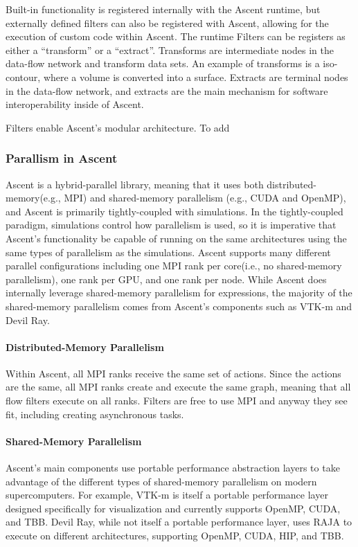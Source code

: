 
Built-in functionality is registered internally with the Ascent runtime,
but externally defined filters can also be registered with Ascent,
allowing for the execution of custom code within Ascent.
%
The runtime Filters can be registers as either a ``transform'' or a ``extract''.
%
Transforms are intermediate nodes in the data-flow network and transform
data sets.
%
An example of transforms is a iso-contour, where a volume is converted
into a surface.
%
Extracts are terminal nodes in the data-flow network, and extracts
are the main mechanism for software interoperability inside of Ascent.

Filters enable Ascent's modular architecture.
%
To add

\subsubsection{Parallism in Ascent}
Ascent is a hybrid-parallel library, meaning that it uses both
distributed-memory(e.g., MPI) and shared-memory parallelism
(e.g., CUDA and OpenMP), and Ascent is primarily  
tightly-coupled with simulations.
%
In the tightly-coupled paradigm, simulations control how parallelism is used, so
it is imperative that Ascent's functionality be capable of running
on the same architectures using the same types of parallelism as the
simulations.
%
Ascent supports many different parallel configurations including
one MPI rank per core(i.e., no shared-memory parallelism), one rank
per GPU, and one rank per node.
%
While Ascent does internally leverage shared-memory parallelism
for expressions, the majority of the shared-memory parallelism comes
from Ascent's components such as VTK-m and Devil Ray.

\paragraph{Distributed-Memory Parallelism}
Within Ascent, all MPI ranks receive the same set of actions.
%
Since the actions are the same, all MPI ranks create and execute the same graph,
meaning
that all flow filters execute on all ranks.
%
Filters are free to use MPI and anyway they see fit, including
creating asynchronous tasks.

\paragraph{Shared-Memory Parallelism}
Ascent's main components use portable performance abstraction layers to
take advantage of the different types of shared-memory parallelism on
modern supercomputers.
%
For example, VTK-m is itself a portable performance layer designed specifically
for visualization and currently supports OpenMP, CUDA, and TBB.
%
Devil Ray, while not itself a portable performance layer, uses RAJA to execute
on different architectures, supporting OpenMP, CUDA, HIP, and TBB.

